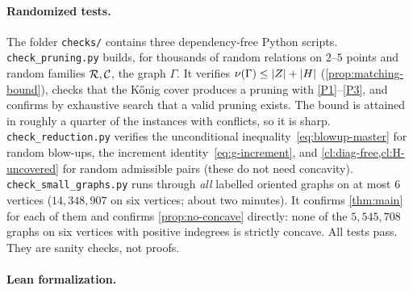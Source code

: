 \paragraph{Randomized tests.}
The folder \texttt{checks/} contains three dependency-free Python scripts.
\texttt{check\_pruning.py} builds, for thousands of random relations on
$2$--$5$ points and random families $\mathcal R,\mathcal C$, the graph $\Gamma$. It verifies
$\nu(\Gamma)\le\lvert Z\rvert+\lvert H\rvert$ (\cref{prop:matching-bound}), checks that the
K\H{o}nig cover produces a pruning with \ref{P1}--\ref{P3}, and confirms by
exhaustive search that a valid pruning exists. The bound is attained in
roughly a quarter of the instances with conflicts, so it is sharp.
\texttt{check\_reduction.py} verifies the unconditional
inequality~\eqref{eq:blowup-master} for random blow-ups, the increment
identity~\eqref{eq:g-increment}, and \cref{cl:diag-free,cl:H-uncovered} for
random admissible pairs (these do not need concavity).
\texttt{check\_small\_graphs.py} runs through \emph{all} labelled oriented
graphs on at most $6$ vertices ($14{,}348{,}907$ on six vertices; about two
minutes). It confirms \cref{thm:main} for each of them and confirms
\cref{prop:no-concave} directly: none of the $5{,}545{,}708$ graphs on six
vertices with positive indegrees is strictly concave. All tests pass. They are sanity checks, not proofs.

\paragraph{Lean formalization.}

